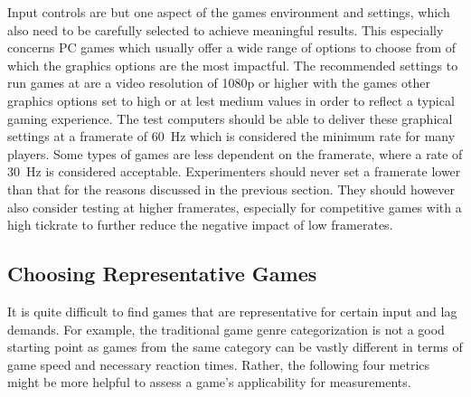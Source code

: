 Input controls are but one aspect of the games environment and settings, which also need to be carefully selected to achieve meaningful results. This especially concerns PC games which usually offer a wide range of options to choose from of which the graphics options are the most impactful. The recommended settings to run games at are a video resolution of 1080p or higher with the games other graphics options set to high or at lest medium values in order to reflect a typical gaming experience. The test computers should be able to deliver these graphical settings at a framerate of \SI{60}{\hertz} which is considered the minimum rate for many players. Some types of games are less dependent on the framerate, where a rate of \SI{30}{\hertz} is considered acceptable. Experimenters should never set a framerate lower than that for the reasons discussed in the previous section. They should however also consider testing at higher framerates, especially for competitive games with a high tickrate to further reduce the negative impact of low framerates.


\subsection{Choosing Representative Games}
\label{sec:game-criteria}

It is quite difficult to find games that are representative for certain input and lag demands. For example, the traditional game genre categorization is not a good starting point as games from the same category can be vastly different in terms of game speed and necessary reaction times. Rather, the following four metrics might be more helpful to assess a game's applicability for measurements.

